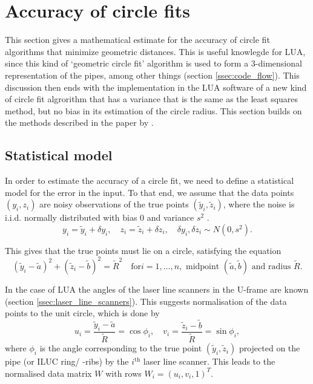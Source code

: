 \section{Accuracy of circle fits} \label{sec:accuracy}
This section gives a mathematical estimate for the accuracy of circle fit algorithms that minimize geometric distances. This is useful knowlegde for LUA, since this kind of `geometric circle fit' algorithm is used to form a 3-dimensional representation of the pipes, among other things (section \ref{ssec:code_flow}). This discussion then ends with the implementation in the LUA software of a new kind of circle fit algrorithm that has a variance that is the same as the least squares method, but no bias in its estimation of the circle radius. This section builds on the methods described in the paper by \citeauthor{alsharadqah_chernov_circle_fitting} \cite{alsharadqah_chernov_circle_fitting}.

\subsection{Statistical model}\label{ssec:statistical_model}
In order to estimate the accuracy of a circle fit, we need to define a statistical model for the error in the input. To that end, we assume that the data points $(y_i, z_i)$ are noisy observations of the true points $(\tilde{y}_i, \tilde{z}_i)$, where the noise is i.i.d. normally distributed with bias 0 and variance $s^2$ \cite[section 2]{alsharadqah_chernov_circle_fitting}.
\begin{equation}
    y_i = \tilde{y}_i + \delta y_i, \quad z_i = \tilde{z}_i + \delta z_i, \quad \delta y_i, \delta z_i \sim N(0, s^2).
\end{equation}

This gives that the true points must lie on a circle, satisfying the equation
\begin{equation}
    (\tilde{y}_i - \tilde{a})^2 + (\tilde{z}_i - \tilde{b})^2 = \tilde{R}^2 \quad \text{for} i = 1, \dots, n, \text{ midpoint } (\tilde{a}, \tilde{b}) \text{ and radius } \tilde{R}.
\end{equation}

In the case of LUA the angles of the laser line scanners in the U-frame are known (section \ref{ssec:laser_line_scanners}). This suggests normalisation of the data points to the unit circle, which is done by
\begin{equation}
    u_i = \frac{\tilde{y}_i - \tilde{a}}{\tilde{R}} = \cos{\phi_i}, \quad v_i = \frac{\tilde{z}_i - \tilde{b}}{\tilde{R}} = \sin{\phi_i},
\end{equation}
where $\phi_i$ is the angle corresponding to the true point $(\tilde{y}_i, \tilde{z}_i)$ projected on the pipe (or ILUC ring/ -ribs) by the $i^{\text{th}}$ laser line scanner. This leads to the normalised data matrix $W$ with rows $W_i = (u_i, v_i, 1)^T$.

